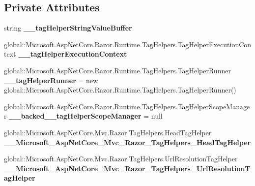 \subsection*{Private Attributes}
\begin{DoxyCompactItemize}
\item 
\mbox{\label{class_asp_net_core_1_1_views___shared____head_a030a476c6eb21bdb02d9c800e448c48c}} 
string {\bfseries \+\_\+\+\_\+tag\+Helper\+String\+Value\+Buffer}
\item 
\mbox{\label{class_asp_net_core_1_1_views___shared____head_a518621a996004ccd87cdcfe6ec416b83}} 
global\+::\+Microsoft.\+Asp\+Net\+Core.\+Razor.\+Runtime.\+Tag\+Helpers.\+Tag\+Helper\+Execution\+Context {\bfseries \+\_\+\+\_\+tag\+Helper\+Execution\+Context}
\item 
\mbox{\label{class_asp_net_core_1_1_views___shared____head_a218a3aa4117b1ac1f8f752430ad23161}} 
global\+::\+Microsoft.\+Asp\+Net\+Core.\+Razor.\+Runtime.\+Tag\+Helpers.\+Tag\+Helper\+Runner {\bfseries \+\_\+\+\_\+tag\+Helper\+Runner} = new global\+::\+Microsoft.\+Asp\+Net\+Core.\+Razor.\+Runtime.\+Tag\+Helpers.\+Tag\+Helper\+Runner()
\item 
\mbox{\label{class_asp_net_core_1_1_views___shared____head_aceac90b102201f742eb2a0bb6ebae01f}} 
global\+::\+Microsoft.\+Asp\+Net\+Core.\+Razor.\+Runtime.\+Tag\+Helpers.\+Tag\+Helper\+Scope\+Manager {\bfseries \+\_\+\+\_\+backed\+\_\+\+\_\+tag\+Helper\+Scope\+Manager} = null
\item 
\mbox{\label{class_asp_net_core_1_1_views___shared____head_a7367d9ef750ef8b309ddbd344830bcc0}} 
global\+::\+Microsoft.\+Asp\+Net\+Core.\+Mvc.\+Razor.\+Tag\+Helpers.\+Head\+Tag\+Helper {\bfseries \+\_\+\+\_\+\+Microsoft\+\_\+\+Asp\+Net\+Core\+\_\+\+Mvc\+\_\+\+Razor\+\_\+\+Tag\+Helpers\+\_\+\+Head\+Tag\+Helper}
\item 
\mbox{\label{class_asp_net_core_1_1_views___shared____head_a4ecbdec09cc49ac8a3cc1ad4f6dcc6c8}} 
global\+::\+Microsoft.\+Asp\+Net\+Core.\+Mvc.\+Razor.\+Tag\+Helpers.\+Url\+Resolution\+Tag\+Helper {\bfseries \+\_\+\+\_\+\+Microsoft\+\_\+\+Asp\+Net\+Core\+\_\+\+Mvc\+\_\+\+Razor\+\_\+\+Tag\+Helpers\+\_\+\+Url\+Resolution\+Tag\+Helper}
\end{DoxyCompactItemize}
